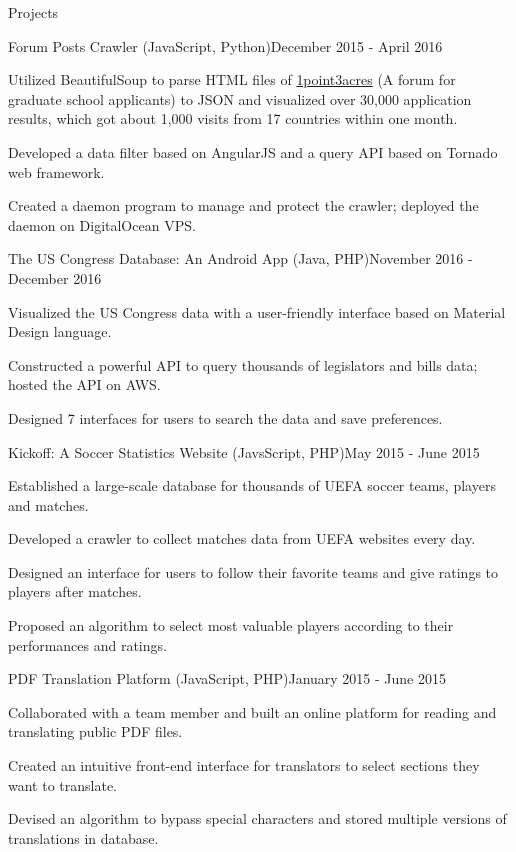 \documentclass{resume} %
\begin{document}
\begin{rSection}{Projects}

\begin{rSubsection}{Forum Posts Crawler (JavaScript, Python)}{December 2015 - April 2016}{}{}
\item Utilized BeautifulSoup to parse HTML files of \href{http://1point3acres.com/bbs/forum.php}{1point3acres} (A forum for graduate school applicants) to JSON and visualized over 30,000 application results, which got about 1,000 visits from 17 countries within one month.
\item Developed a data filter based on AngularJS and a query API based on Tornado web framework.
\item Created a daemon program to manage and protect the crawler; deployed the daemon on DigitalOcean VPS.
\end{rSubsection}

\begin{rSubsection}{The US Congress Database: An Android App (Java, PHP)}{November 2016 - December 2016}{}{}
\item Visualized the US Congress data with a user-friendly interface based on Material Design language.
\item Constructed a powerful API to query thousands of legislators and bills data; hosted the API on AWS.
\item Designed 7 interfaces for users to search the data and save preferences.
\end{rSubsection}

\begin{rSubsection}{Kickoff: A Soccer Statistics Website (JavsScript, PHP)}{May 2015 - June 2015}{}{}
\item Established a large-scale database for thousands of UEFA soccer teams, players and matches.
\item Developed a crawler to collect matches data from UEFA websites every day.
\item Designed an interface for users to follow their favorite teams and give ratings to players after matches.
\item Proposed an algorithm to select most valuable players according to their performances and ratings.
\end{rSubsection}

\begin{rSubsection}{PDF Translation Platform (JavaScript, PHP)}{January 2015 - June 2015}{}{}
\item Collaborated with a team member and built an online platform for reading and translating public PDF files.
\item Created an intuitive front-end interface for translators to select sections they want to translate.
\item Devised an algorithm to bypass special characters and stored multiple versions of translations in database.
\end{rSubsection}


\end{rSection}
\end{document}
